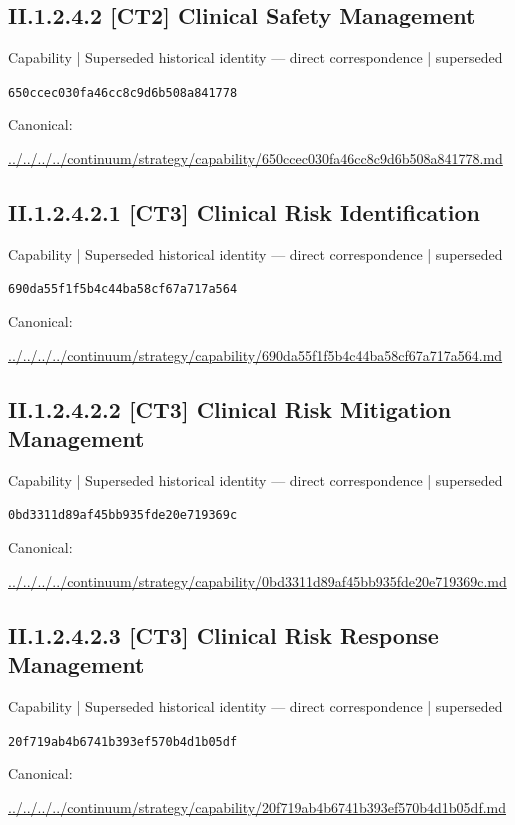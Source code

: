 \documentclass[10pt,a4paper]{article}
\begin{document}
\subsection*{II.1.2.4.2 [CT2] Clinical Safety Management}
{\small Capability | Superseded historical identity — direct correspondence | superseded}\par
\texttt{650ccec030fa46cc8c9d6b508a841778}\par
Canonical: \par
{\footnotesize\url{../../../../continuum/strategy/capability/650ccec030fa46cc8c9d6b508a841778.md}}\par
\subsection*{II.1.2.4.2.1 [CT3] Clinical Risk Identification}
{\small Capability | Superseded historical identity — direct correspondence | superseded}\par
\texttt{690da55f1f5b4c44ba58cf67a717a564}\par
Canonical: \par
{\footnotesize\url{../../../../continuum/strategy/capability/690da55f1f5b4c44ba58cf67a717a564.md}}\par
\subsection*{II.1.2.4.2.2 [CT3] Clinical Risk Mitigation Management}
{\small Capability | Superseded historical identity — direct correspondence | superseded}\par
\texttt{0bd3311d89af45bb935fde20e719369c}\par
Canonical: \par
{\footnotesize\url{../../../../continuum/strategy/capability/0bd3311d89af45bb935fde20e719369c.md}}\par
\subsection*{II.1.2.4.2.3 [CT3] Clinical Risk Response Management}
{\small Capability | Superseded historical identity — direct correspondence | superseded}\par
\texttt{20f719ab4b6741b393ef570b4d1b05df}\par
Canonical: \par
{\footnotesize\url{../../../../continuum/strategy/capability/20f719ab4b6741b393ef570b4d1b05df.md}}\par
\end{document}
